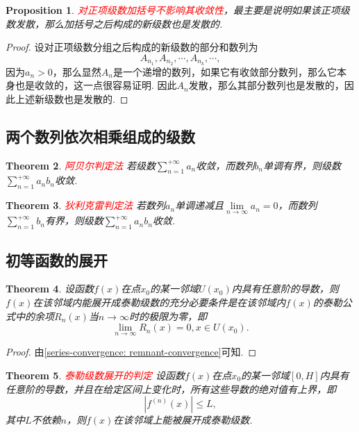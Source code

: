 \documentclass{article}
\newtheorem{theorem}{Theorem}[section]
\newtheorem{proposition}[theorem]{Proposition}
\newcommand{\redt}[1]{\textcolor{red}{#1}}
\begin{document}
\begin{proposition}
\rm \redt{对正项级数加括号不影响其收敛性}，最主要是说明如果该正项级数发散，那么加括号之后构成的新级数也是发散的. 
\end{proposition}

\begin{proof}
设对正项级数分组之后构成的新级数的部分和数列为
$$
A_{n_1},A_{n_2},\cdots, A_{n_k},\cdots,
$$
因为$a_n > 0$，那么显然${A_{n}}$是一个递增的数列，如果它有收敛部分数列，那么它本身也是收敛的，这一点很容易证明. 因此${A_{n}}$发散，那么其部分数列也是发散的，因此上述新级数也是发散的. 
\end{proof}

\subsection{两个数列依次相乘组成的级数}


\begin{theorem}
\rm \redt{阿贝尔判定法} 若级数$\sum\limits_{n=1}^{+\infty}a_n$收敛，而数列$b_n$单调有界，则级数$\sum\limits_{n=1}^{+\infty}a_nb_n$收敛. 
\end{theorem}

\begin{theorem}
\rm \redt{狄利克雷判定法} 若数列$a_n$单调递减且$\lim\limits_{n \to \infty} a_n = 0$，而数列$\sum\limits_{n=1}^{+\infty}b_n$有界，则级数$\sum\limits_{n=1}^{+\infty} a_nb_n$收敛. 
\end{theorem}

\newpage
\subsection{初等函数的展开}

\begin{theorem}
\rm 设函数$f(x)$在点$x_0$的某一邻域$U(x_0)$内具有任意阶的导数，则$f(x)$在该邻域内能展开成泰勒级数的充分必要条件是在该邻域内$f(x)$的泰勒公式中的余项$R_n(x)$当$n \to \infty$时的极限为零，即
$$
\lim\limits_{n \to \infty} R_n(x) = 0, x \in U(x_0).
$$
\end{theorem}

\begin{proof}
由\ref{series-convergence: remnant-convergence}可知. 
\end{proof}

\begin{theorem}
\rm \redt{泰勒级数展开的判定} 设函数$f(x)$在点$x_0$的某一邻域$[0,H]$内具有任意阶的导数，并且在给定区间上变化时，所有这些导数的绝对值有上界，即
$$
|f^{(n)}(x)| \leq L,
$$
其中$L$不依赖$n$，则$f(x)$在该邻域上能被展开成泰勒级数. 
\end{theorem}
\end{document}
